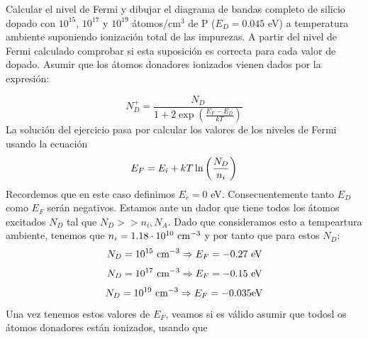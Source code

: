 \begin{texercise}
	Calcular el nivel de Fermi y dibujar el diagrama de bandas completo de silicio dopado con $10^{15}$, $10^{17}$ y $10^{19}$ átomos/cm$^3$ de P ($E_D = 0.045$ eV) a temperatura ambiente suponiendo ionización total de las impurezas. A partir del nivel de Fermi calculado comprobar si esta suposición es correcta para cada valor de dopado. Asumir que los átomos donadores ionizados vienen dados por la expresión:

	\begin{equation}
		N_D^+ = \frac{N_D}{1 + 2 \exp \left( \frac{E_F - E_D}{kT} \right)}
	\end{equation}
	\tcblower
	La solución del ejercicio pasa por calcular los valores de los niveles de Fermi usando la ecuación
	\begin{equation}
		E_F = E_i + kT \ln \left( \frac{N_D}{n_i} \right)
	\end{equation}
	Recordemos que en este caso definimos $E_{c}=0$ eV. Consecuentemente tanto $E_D$ como $E_F$ serán negativos. Estamos ante un dador que tiene todos los átomos excitados $N_D$ tal que $N_D>>n_i,N_A$. Dado que consideramos esto a tempeartura ambiente, tenemos que $n_i=1.18\cdot 10^{10} \ \text{cm}^{-3}$ y por tanto que para estos $N_D$:
	\begin{equation}
		N_D=10^{15} \ \text{cm}^{-3} \Rightarrow E_F = -0.27 \ \text{eV}
	\end{equation}
	\begin{equation}
		N_D=10^{17} \ \text{cm}^{-3} \Rightarrow E_F = -0.15  \ \text{eV}
	\end{equation}
	\begin{equation}
		N_D=10^{19} \ \text{cm}^{-3} \Rightarrow E_F = -0.035  \text{eV}
	\end{equation}
	Una vez tenemos estos valores de $E_F$, veamos si es válido asumir que todosl os átomos donadores están ionizados, usando que


\end{texercise}

